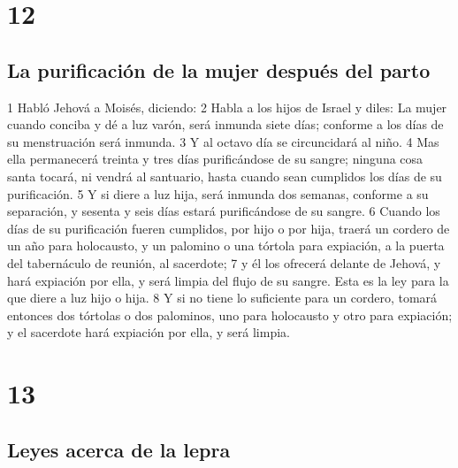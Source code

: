 \chapter{12}

\section{La purificación de la mujer después del parto}

1 Habló Jehová a Moisés, diciendo:
2 Habla a los hijos de Israel y diles: La mujer cuando conciba y dé a luz varón, será inmunda siete días; conforme a los días de su menstruación será inmunda.
3 Y al octavo día se circuncidará al niño.
4 Mas ella permanecerá treinta y tres días purificándose de su sangre; ninguna cosa santa tocará, ni vendrá al santuario, hasta cuando sean cumplidos los días de su purificación.
5 Y si diere a luz hija, será inmunda dos semanas, conforme a su separación, y sesenta y seis días estará purificándose de su sangre.
6 Cuando los días de su purificación fueren cumplidos, por hijo o por hija, traerá un cordero de un año para holocausto, y un palomino o una tórtola para expiación, a la puerta del tabernáculo de reunión, al sacerdote;
7 y él los ofrecerá delante de Jehová, y hará expiación por ella, y será limpia del flujo de su sangre. Esta es la ley para la que diere a luz hijo o hija.
8 Y si no tiene lo suficiente para un cordero, tomará entonces dos tórtolas o dos palominos, uno para holocausto y otro para expiación; y el sacerdote hará expiación por ella, y será limpia.  

\chapter{13}

\section{Leyes acerca de la lepra}

